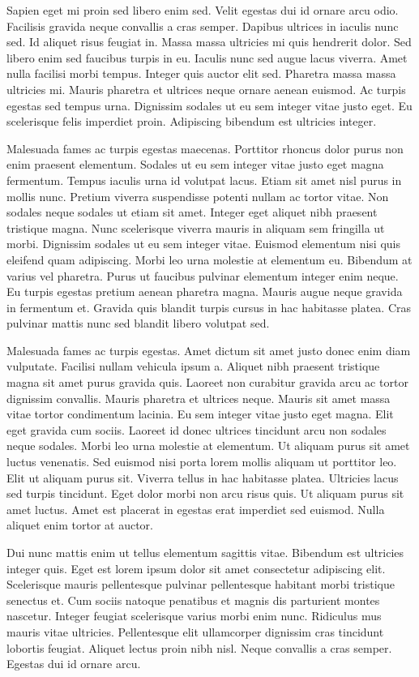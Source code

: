 \documentclass[11pt,a4paper]{article}
\begin{document}
Sapien eget mi proin sed libero enim sed. Velit egestas dui id ornare arcu odio. Facilisis gravida neque convallis a cras semper. Dapibus ultrices in iaculis nunc sed. Id aliquet risus feugiat in. Massa massa ultricies mi quis hendrerit dolor. Sed libero enim sed faucibus turpis in eu. Iaculis nunc sed augue lacus viverra. Amet nulla facilisi morbi tempus. Integer quis auctor elit sed. Pharetra massa massa ultricies mi. Mauris pharetra et ultrices neque ornare aenean euismod. Ac turpis egestas sed tempus urna. Dignissim sodales ut eu sem integer vitae justo eget. Eu scelerisque felis imperdiet proin. Adipiscing bibendum est ultricies integer.

Malesuada fames ac turpis egestas maecenas. Porttitor rhoncus dolor purus non enim praesent elementum. Sodales ut eu sem integer vitae justo eget magna fermentum. Tempus iaculis urna id volutpat lacus. Etiam sit amet nisl purus in mollis nunc. Pretium viverra suspendisse potenti nullam ac tortor vitae. Non sodales neque sodales ut etiam sit amet. Integer eget aliquet nibh praesent tristique magna. Nunc scelerisque viverra mauris in aliquam sem fringilla ut morbi. Dignissim sodales ut eu sem integer vitae. Euismod elementum nisi quis eleifend quam adipiscing. Morbi leo urna molestie at elementum eu. Bibendum at varius vel pharetra. Purus ut faucibus pulvinar elementum integer enim neque. Eu turpis egestas pretium aenean pharetra magna. Mauris augue neque gravida in fermentum et. Gravida quis blandit turpis cursus in hac habitasse platea. Cras pulvinar mattis nunc sed blandit libero volutpat sed.

Malesuada fames ac turpis egestas. Amet dictum sit amet justo donec enim diam vulputate. Facilisi nullam vehicula ipsum a. Aliquet nibh praesent tristique magna sit amet purus gravida quis. Laoreet non curabitur gravida arcu ac tortor dignissim convallis. Mauris pharetra et ultrices neque. Mauris sit amet massa vitae tortor condimentum lacinia. Eu sem integer vitae justo eget magna. Elit eget gravida cum sociis. Laoreet id donec ultrices tincidunt arcu non sodales neque sodales. Morbi leo urna molestie at elementum. Ut aliquam purus sit amet luctus venenatis. Sed euismod nisi porta lorem mollis aliquam ut porttitor leo. Elit ut aliquam purus sit. Viverra tellus in hac habitasse platea. Ultricies lacus sed turpis tincidunt. Eget dolor morbi non arcu risus quis. Ut aliquam purus sit amet luctus. Amet est placerat in egestas erat imperdiet sed euismod. Nulla aliquet enim tortor at auctor.

Dui nunc mattis enim ut tellus elementum sagittis vitae. Bibendum est ultricies integer quis. Eget est lorem ipsum dolor sit amet consectetur adipiscing elit. Scelerisque mauris pellentesque pulvinar pellentesque habitant morbi tristique senectus et. Cum sociis natoque penatibus et magnis dis parturient montes nascetur. Integer feugiat scelerisque varius morbi enim nunc. Ridiculus mus mauris vitae ultricies. Pellentesque elit ullamcorper dignissim cras tincidunt lobortis feugiat. Aliquet lectus proin nibh nisl. Neque convallis a cras semper. Egestas dui id ornare arcu.
\end{document}
